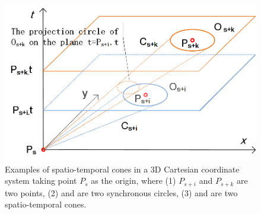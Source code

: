 




\begin{figure}[tb!]
	\centering
	\includegraphics[scale=0.86]{figures/Fig-CIS.png}
	\vspace{-2ex}
	\caption{\small Examples of spatio-temporal cones in a 3D Cartesian coordinate system taking point $P_s$ as the origin, where (1) $P_{s+i}$ and $P_{s+k}$ are two points, (2)  and  are two synchronous circles, (3)  and  are two spatio-temporal cones.}
	\vspace{-2ex}
	\label{fig:cis}
\end{figure}


